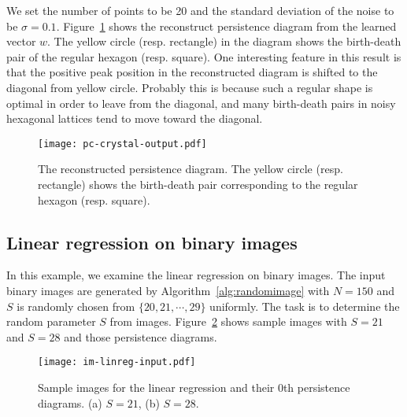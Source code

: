 \documentclass[smallextended]{svjour3}
\begin{document}
We set the number of points to be 20 and the standard deviation of the noise to be $\sigma = 0.1$. 
Figure~\ref{fig:pc-crystal-output} shows the reconstruct persistence diagram from the learned vector $w$.  The yellow circle (resp. rectangle) in the diagram shows the birth-death pair of the regular hexagon (resp. square).  One interesting feature in this result is that the positive peak position in the reconstructed diagram is shifted to the diagonal from yellow circle. Probably this is because such a regular shape is optimal in order to leave from the diagonal, and many birth-death pairs in noisy hexagonal lattices tend to move toward the diagonal. 



\begin{figure}[htbp]
  \centering
  \texttt{[image: pc-crystal-output.pdf]}
  \caption{The reconstructed persistence diagram. The yellow circle (resp. rectangle)
  shows the birth-death pair corresponding to the regular hexagon (resp. square).}
  \label{fig:pc-crystal-output}
\end{figure}






\subsection{Linear regression on binary images}
In this example, we examine the linear regression on binary images.
The input binary images are generated by Algorithm~\ref{alg:randomimage}
with $N=150$ and $S$ is randomly chosen from $\{20, 21, \cdots, 29\}$ uniformly.
The task is to determine the random parameter $S$ from images.
Figure~\ref{fig:im_linreg_input} shows sample images with $S=21$ and $S=28$ and those persistence diagrams. 

\begin{figure}[htbp]
  \centering
  \texttt{[image: im-linreg-input.pdf]}
  \caption{Sample images for the linear regression and
    their 0th persistence diagrams. (a) $S=21$, (b) $S=28$.}
  \label{fig:im_linreg_input}
\end{figure}
\end{document}
